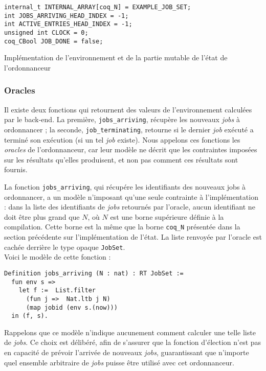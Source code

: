 	\begin{listing}[!hb]
	\begin{verbatim}
internal_t INTERNAL_ARRAY[coq_N] = EXAMPLE_JOB_SET;
int JOBS_ARRIVING_HEAD_INDEX = -1;
int ACTIVE_ENTRIES_HEAD_INDEX = -1;
unsigned int CLOCK = 0;
coq_CBool JOB_DONE = false;
	\end{verbatim}
	\caption{Implémentation de l'environnement et de la partie mutable de l'état de l'ordonnanceur}
	\label{code:sched_state_impl}
	\end{listing}

	\subsubsection{Oracles}

	Il existe deux fonctions qui retournent des valeurs de l'environnement calculées par le back-end. La première, \texttt{jobs\_arriving}, récupère les nouveaux \emph{jobs} à ordonnancer ; la seconde, \texttt{job\_terminating}, retourne si le dernier \emph{job} exécuté a terminé son exécution (si un tel \emph{job} existe). Nous appelons ces fonctions les \emph{oracles} de l'ordonnanceur, car leur modèle ne décrit que les contraintes imposées sur les résultats qu'elles produisent, et non pas comment ces résultats sont fournis.

	La fonction \texttt{jobs\_arriving}, qui récupére les identifiants des nouveaux jobs à ordonnancer, a un modèle n'imposant qu'une seule contrainte à l'implémentation : dans la liste des identifiants de \emph{jobs} retournés par l'oracle, aucun identifiant ne doit être plus grand que $N$, où $N$ est une borne supérieure définie à la compilation. Cette borne est la même que la borne \texttt{coq\_N} présentée dans la section précédente sur l'implémentation de l'état. La liste renvoyée par l'oracle est cachée derrière le type opaque \texttt{JobSet}.\\
	Voici le modèle de cette fonction :

	\begin{verbatim}
Definition jobs_arriving (N : nat) : RT JobSet :=
  fun env s =>
    let f :=  List.filter
      (fun j =>  Nat.ltb j N)
      (map jobid (env s.(now))) 
  in (f, s).
	\end{verbatim}

	Rappelons que ce modèle n'indique aucunement comment calculer une telle liste de \emph{jobs}. Ce choix est délibéré, afin de s'assurer que la fonction d'élection n'est pas en capacité de prévoir l'arrivée de nouveaux \emph{jobs}, guarantissant que n'importe quel ensemble arbitraire de \emph{jobs} puisse être utilisé avec cet ordonnanceur.

